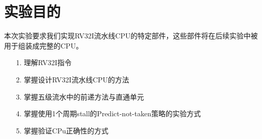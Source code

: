 \section{实验目的}
本次实验要求我们实现RV32I流水线CPU的特定部件，这些部件将在后续实验中被用于组装成完整的CPU。
\begin{itemize}
    \item [1.] 理解RV32I指令
    \item [2.] 掌握设计RV32I流水线CPU的方法
    \item [3.] 掌握五级流水中的前递方法与直通单元
    \item [4.] 掌握使用1个周期stall的Predict-not-taken策略的实验方式
    \item [5.] 掌握验证CPu正确性的方式
\end{itemize}    